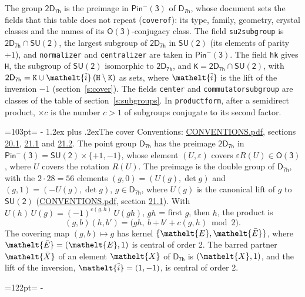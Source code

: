 \documentclass[10pt,a4paper]{article}
\makeatletter
\renewcommand\section{\@startsection{section}{1}{\z@}{-3ex plus -1ex minus -.2ex}%
  {1.2ex plus .2ex}{\normalfont\large\sffamily\bfseries\color{parttitle}}}
\newcommand{\needspace}[1]{\par\penalty-100\begingroup\dimen0=#1\relax\dimen2=\pagegoal
  \advance\dimen2-\pagetotal\ifdim\dimen0>\dimen2\relax\ifdim\dimen2>0pt\vfil\break\fi\fi
  \endgroup}
\numberwithin{equation}{section}
\newcommand{\eltfont}[1]{{\let\sigma\eltsigma\mathelt{#1}}}
\newcommand{\grp}[1]{\mathsf{#1}}
\newcommand{\elt}[1]{\eltfont{#1}}
\newcommand{\dirprod}{\times}
\newcommand{\barred}[1]{\bar{#1}}
\newcommand{\lift}[1]{\tilde{#1}}
\makeatother
\begin{document}
\leavevmode\label{n:element.inversion}\label{n:group.preimage}The group $\grp{2D_{7h}}$ is the preimage in $\grp{Pin^{-}(3)}$ of \href{../../../rotation/data/pdf/D7h.pdf}{$\grp{D_{7h}}$}, whose document sets the fields that this table does not repeat (\texttt{coverof}): its type, family, geometry, crystal classes and the names of its \href{../../../rotation/data/pdf/O3.pdf}{$\grp{O(3)}$}-conjugacy class. The field \texttt{su2subgroup} is $\grp{2D_{7h}} \cap \grp{SU(2)}$, the largest subgroup of $\grp{2D_{7h}}$ in $\grp{SU(2)}$ (its elements of parity $+1$), and \texttt{normalizer} and \texttt{centralizer} are taken in $\grp{Pin^{-}(3)}$. The field \texttt{hk} gives \texttt{H}, the subgroup of $\grp{SU(2)}$ isomorphic to $\grp{2D_{7h}}$, and \texttt{K}${} = \grp{2D_{7h}} \cap \grp{SU(2)}$, with $\grp{2D_{7h}} = \texttt{K} \cup \elt{\lift{i}}\,(\texttt{H} \setminus \texttt{K})$ as sets, where $\elt{\lift{i}}$ is the lift of the inversion $-1$ (section~\ref{s:cover}). The fields \texttt{center} and \texttt{commutatorsubgroup} are classes of the table of section~\ref{s:subgroups}.
\leavevmode\label{n:index.conjugates.c}In \texttt{productform}, after a semidirect product, ${\times}c$ is the number $c > 1$ of subgroups conjugate to its second factor.
\needspace{103pt}
\section{The cover}\label{s:cover}
Conventions: \href{../../CONVENTIONS.pdf}{CONVENTIONS.pdf}, sections \href{../../CONVENTIONS.pdf\#conv.20.1}{20.1}, \href{../../CONVENTIONS.pdf\#conv.21.1}{21.1} and \href{../../CONVENTIONS.pdf\#conv.21.2}{21.2}.
\leavevmode\label{n:group.pin.minus}\label{n:group.su2}\label{n:local.pin.sign}\label{n:matrix.covered}\label{n:matrix.lift.su2}\label{n:index.bar}The point group $\grp{D_{7h}}$ has the preimage $\grp{2D_{7h}}$ in $\grp{Pin^{-}(3)} = \grp{SU(2)} \dirprod \{+1, -1\}$, whose element $(U, \varepsilon)$ covers $\varepsilon R(U) \in \grp{O(3)}$, where $U$ covers the rotation $R(U)$. The preimage is the double group of $\grp{D_{7h}}$, with the $2 \cdot 28 = 56$ elements $(g, 0) = (U(g), \det g)$ and $(g, 1) = (-U(g), \det g)$, $g \in \grp{D_{7h}}$, where $U(g)$ is the canonical lift of $g$ to $\grp{SU(2)}$ (\href{../../CONVENTIONS.pdf}{CONVENTIONS.pdf}, section \href{../../CONVENTIONS.pdf\#conv.21.1}{21.1}). \label{n:function.cocycle}With $U(h)\,U(g) = (-1)^{c(g,h)}\,U(gh)$, $gh$ = first $g$, then $h$, the product is
\begin{equation}\label{e:product}(g, b)(h, b') = \bigl(gh,\ b + b' + c(g, h) \bmod 2\bigr).\end{equation}
\leavevmode\label{n:mark.bar}The covering map $(g, b) \mapsto g$ has kernel $\{\elt{E}, \elt{\barred{E}}\}$, where $\elt{\barred{E}} = (\elt{E}, 1)$ is central of order 2. \label{n:element.named}\label{n:mark.lift}The barred partner $\elt{\barred{X}}$ of an element $\elt{X}$ of $\grp{D_{7h}}$ is $(\elt{X}, 1)$, and the lift of the inversion, $\elt{\lift{i}} = (1, -1)$, is central of order 2.
\needspace{122pt}
\end{document}
